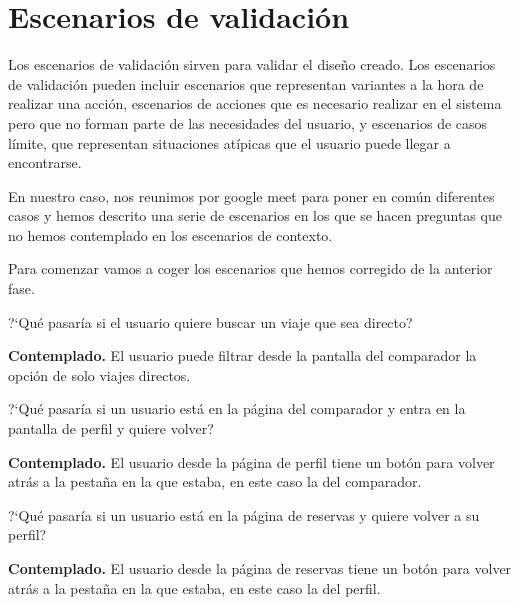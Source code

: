 \section{Escenarios de validación}

Los escenarios de validación sirven para validar el diseño creado. Los escenarios de validación pueden incluir escenarios que representan variantes a la hora de realizar una acción, escenarios de acciones que es necesario realizar en el sistema pero que no forman parte de las necesidades del usuario, y escenarios de casos límite, que representan situaciones atípicas que el usuario puede llegar a encontrarse.

En nuestro caso, nos reunimos por google meet para poner en común diferentes casos y hemos descrito una serie de escenarios en los que se hacen preguntas que no hemos contemplado en los escenarios de contexto.

Para comenzar vamos a coger los escenarios que hemos corregido de la anterior fase.

\begin{escenario} %
    \centering
    ?`Qué pasaría si el usuario quiere buscar un viaje que sea directo?

    \begin{solucion}
        \centering
        \textbf{Contemplado.} El usuario puede filtrar desde la pantalla del comparador la opción de solo viajes directos.
    \end{solucion}
\end{escenario}


\begin{escenario}
    \centering
    ?`Qué pasaría si un usuario está en la página del comparador y entra en la pantalla de perfil y quiere volver?

    \begin{solucion}
        \centering
        \textbf{Contemplado.} El usuario desde la página de perfil tiene un botón para volver atrás a la pestaña en la que estaba, en este caso la del comparador.
    \end{solucion}
\end{escenario}

\begin{escenario}
    \centering
    ?`Qué pasaría si un usuario está en la página de reservas y quiere volver a su perfil?

    \begin{solucion}
        \centering
        \textbf{Contemplado.} El usuario desde la página de reservas tiene un botón para volver atrás a la pestaña en la que estaba, en este caso la del perfil.
    \end{solucion}
\end{escenario}

